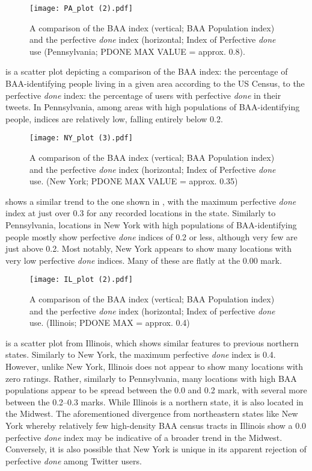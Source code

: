 \documentclass[output=paper,draftmode,colorlinks,citecolor=brown]{langscibook}
\begin{document}
\begin{figure}[p]
\texttt{[image: PA\_plot (2).pdf]}
\caption{\label{fig:baxter:5} A comparison of the BAA index (vertical; BAA Population index)
and the perfective \textit{done} index (horizontal; Index of Perfective \textit{done} use
(Pennsylvania; PDONE MAX VALUE = approx. 0.8).}
\end{figure}


 is a scatter plot depicting a comparison of the BAA index: the percentage of BAA-identifying people living in a given area according to the US Census, to the perfective \textit{done} index: the percentage of users with perfective \textit{done} in their tweets. In Pennsylvania, among areas with high populations of BAA-identifying people, indices are relatively low, falling entirely below 0.2.

\begin{figure}[p]
\texttt{[image: NY\_plot (3).pdf]}
\caption{\label{fig:baxter:6} A comparison of the BAA index (vertical; BAA Population index)
and the perfective \textit{done} index (horizontal; Index of Perfective \textit{done} use. (New York; PDONE MAX VALUE = approx. 0.35)}
\end{figure}


 shows a similar trend to the one shown in , with the maximum perfective \textit{done} index at just over 0.3 for any recorded locations in the state. Similarly to Pennsylvania, locations in New York with high populations of BAA-identifying people mostly show perfective \textit{done} indices of 0.2 or less, although very few are just above 0.2. Most notably, New York appears to show many locations with very low perfective \textit{done} indices. Many of these are flatly at the 0.00 mark.

\begin{figure}[p]
\texttt{[image: IL\_plot (2).pdf]}
\caption{\label{fig:baxter:7} A comparison of the BAA index (vertical; BAA Population index) and the perfective \textit{done} index (horizontal; Index of perfective \textit{done} use. (Illinois; PDONE MAX = approx. 0.4)}
\end{figure}

 is a scatter plot from Illinois, which shows similar features to previous northern states. Similarly to New York, the maximum perfective \textit{done} index is 0.4. However, unlike New York, Illinois does not appear to show many locations with zero ratings. Rather, similarly to Pennsylvania, many locations with high BAA populations appear to be spread between the 0.0 and 0.2 mark, with several more between the 0.2--0.3 marks. While Illinois is a northern state, it is also located in the Midwest. The aforementioned divergence from northeastern states like New York whereby relatively few high-density BAA census tracts in Illinois show a 0.0 perfective \textit{done} index may be indicative of a broader trend in the Midwest. Conversely, it is also possible that New York is unique in its apparent rejection of perfective \textit{done} among Twitter users.
\end{document}
